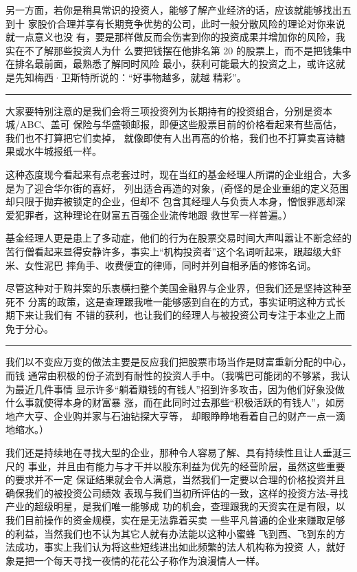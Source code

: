 \documentclass[UTF8,a4paper,zihao=-4,fontset = windows]{ctexart} %
\begin{document}
另一方面，若你是稍具常识的投资人，能够了解产业经济的话，应该就能够找出五到十
家股价合理并享有长期竞争优势的公司，此时一般分散风险的理论对你来说就一点意义也没
有，要是那样做反而会伤害到你的投资成果并增加你的风险，我实在不了解那些投资人为什
么要把钱摆在他排名第 20 的股票上，而不是把钱集中在排名最前面，最熟悉了解同时风险
最小，获利可能最大的投资之上，或许这就是先知梅西·卫斯特所说的：“好事物越多，就越
精彩”。

\rule{10cm}{0.4pt}

大家要特别注意的是我们会将三项投资列为长期持有的投资组合，分别是资本城/ABC、盖可
保险与华盛顿邮报，即便这些股票目前的价格看起来有些高估，我们也不打算把它们卖掉，
就像即使有人出再高的价格，我们也不打算卖喜诗糖果或水牛城报纸一样。

这种态度现今看起来有点老套过时，现在当红的基金经理人所谓的企业组合，大多是为了迎合华尔街的喜好，
列出适合再造的对象，(奇怪的是企业重组的定义范围却只限于拋弃被锁定的企业，但却不
包含其经理人与负责人本身，憎恨罪恶却深爱犯罪者，这种理论在财富五百强企业流传地跟
救世军一样普遍。）

基金经理人更是患上了多动症，他们的行为在股票交易时间大声叫嚣让不断念经的
苦行僧看起来显得安静许多，事实上“机构投资者”这个名词听起来，跟超级大虾米、女性泥巴
摔角手、收费便宜的律师，同时并列自相矛盾的修饰名词。

尽管这种对于购并案的乐衷横扫整个美国金融界与企业界，但我们还是坚持这种至死不
分离的政策，这是查理跟我唯一能够感到自在的方式，事实证明这种方式长期下来让我们有
不错的获利，也让我们的经理人与被投资公司专注于本业之上而免于分心。

\rule{10cm}{0.4pt}

我们以不变应万变的做法主要是反应我们把股票市场当作是财富重新分配的中心，而钱
通常由积极的份子流到有耐性的投资人手中。（我嘴巴可能闭的不够紧，我认为最近几件事情
显示许多“躺着赚钱的有钱人”招到许多攻击，因为他们好象没做什么事就使得本身的财富暴
涨，而在此同时过去那些“积极活跃的有钱人”，如房地产大亨、企业购并家与石油钻探大亨等，
却眼睁睁地看着自己的财产一点一滴地缩水。）

我们还是持续地在寻找大型的企业，那种令人容易了解、具有持续性且让人垂涎三尺的
事业，并且由有能力与才干并以股东利益为优先的经营阶层，虽然这些重要的要求并不一定
保证结果就会令人满意，当然我们一定要以合理的价格投资并且确保我们的被投资公司绩效
表现与我们当初所评估的一致，这样的投资方法-寻找产业的超级明星，是我们唯一能够成
功的机会，查理跟我的天资实在是有限，以我们目前操作的资金规模，实在是无法靠着买卖
一些平凡普通的企业来赚取足够的利益，当然我们也不认为其它人就有办法能以这种小蜜蜂
飞到西、飞到东的方法成功，事实上我们认为将这些短线进出如此频繁的法人机构称为投资
人，就好象是把一个每天寻找一夜情的花花公子称作为浪漫情人一样。
\end{document}
